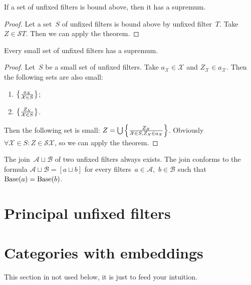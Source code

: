 \begin{cor}
If a set of unfixed filters is bound above, then it has
a supremum.
\end{cor}

\begin{proof}
Let a set~$S$ of unfixed filters is bound above by unfixed
filter~$T$. Take $Z\in\mathscr{S}T$. Then we can apply
the theorem.
\end{proof}

\begin{cor}
Every small set of unfixed filters has a supremum.
\end{cor}

\begin{proof}
Let~$S$ be a small set of unfixed filters.
Take $a_{\mathcal{X}}\in\mathcal{X}$ and
$Z_{\mathcal{X}}\in a_{\mathcal{X}}$.
Then the following sets are also small:
\begin{enumerate}
\item $\left\{ \frac{a_\mathcal{X}}{\mathcal{X}\in S}\right\}$;
\item $\left\{ \frac{Z_\mathcal{X}}{\mathcal{X}\in S}\right\}$.
\end{enumerate}
Then the following set is small:
$Z=\bigcup\left\{ \frac{Z_\mathcal{X}}{\mathcal{X}\in S, Z_\mathcal{X}\in a_\mathcal{X}}\right\}$.
Obviously
$\forall\mathcal{X}\in S:Z\in\mathscr{S}\mathcal{X}$, so
we can apply the theorem.
\end{proof}

\begin{cor}
The join~$\mathcal{A}\sqcup\mathcal{B}$ of two unfixed filters always exists.
The join conforms to the formula
$\mathcal{A}\sqcup\mathcal{B}=[a\sqcup b]$ for every
filters~$a\in\mathcal{A}$,~$b\in\mathcal{B}$ such that
$\operatorname{Base}(a)=\operatorname{Base}(b)$.
\end{cor}


\section{Principal unfixed filters}


\section{Categories with embeddings}

\begin{note}
  This section in not used below, it is just to feed your intuition.
\end{note}

